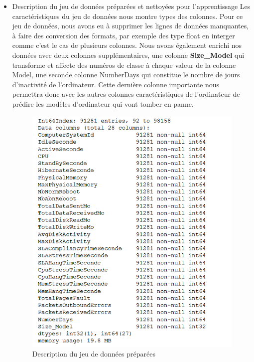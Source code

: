 \begin{itemize}[label=\textbullet, font=\LARGE \color{black}]
\newpage
\item Description du jeu de données préparées et nettoyées pour l'apprentissage
\newline
Les caractéristiques du jeu de données nous montre types des colonnes. Pour ce jeu de données, nous avons eu à supprimer les lignes de données manquantes, à faire des conversion des formats, par exemple des type float en interger comme c'est le cas de plusieurs colonnes. Nous avons également enrichi nos données avec deux colonnes supplémentaires, une colonne \textbf{Size\_Model} qui transforme et affecte des numéros de classe à chaque valeur de la colonne Model, une seconde colonne NumberDays qui constitue le nombre de jours d'inactivité de l'ordinateur. Cette dernière colonne importante nous permettra donc avec les autres colonnes caractéristiques de l'ordinateur de prédire les modèles d'ordinateur qui vont tomber en panne.
\begin{figure}[h]
\begin{center}
\includegraphics[scale=0.90]{Description_Donnees_apprentissage.png}
\caption[Description du jeu de données préparées]{Description du jeu de données préparées}
\label{monlabel}
\end{center}
\end{figure}



\end{itemize}
